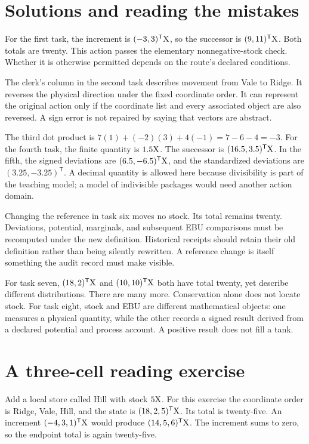\section{Solutions and reading the mistakes}

For the first task, the increment is \((-3,3)^{\mathsf T}\mathrm{X}\), so the successor is \((9,11)^{\mathsf T}\mathrm{X}\). Both totals are twenty. This action passes the elementary nonnegative-stock check. Whether it is otherwise permitted depends on the route's declared conditions.

The clerk's column in the second task describes movement from Vale to Ridge. It reverses the physical direction under the fixed coordinate order. It can represent the original action only if the coordinate list and every associated object are also reversed. A sign error is not repaired by saying that vectors are abstract.

The third dot product is \(7(1)+(-2)(3)+4(-1)=7-6-4=-3\). For the fourth task, the finite quantity is \(1.5\mathrm{X}\). The successor is \((16.5,3.5)^{\mathsf T}\mathrm{X}\). In the fifth, the signed deviations are \((6.5,-6.5)^{\mathsf T}\mathrm{X}\), and the standardized deviations are \((3.25,-3.25)^{\mathsf T}\). A decimal quantity is allowed here because divisibility is part of the teaching model; a model of indivisible packages would need another action domain.

Changing the reference in task six moves no stock. Its total remains twenty. Deviations, potential, marginals, and subsequent EBU comparisons must be recomputed under the new definition. Historical receipts should retain their old definition rather than being silently rewritten. A reference change is itself something the audit record must make visible.

For task seven, \((18,2)^{\mathsf T}\mathrm{X}\) and \((10,10)^{\mathsf T}\mathrm{X}\) both have total twenty, yet describe different distributions. There are many more. Conservation alone does not locate stock. For task eight, stock and EBU are different mathematical objects: one measures a physical quantity, while the other records a signed result derived from a declared potential and process account. A positive result does not fill a tank.

\section{A three-cell reading exercise}

Add a local store called Hill with stock \(5\mathrm{X}\). For this exercise the coordinate order is Ridge, Vale, Hill, and the state is \((18,2,5)^{\mathsf T}\mathrm{X}\). Its total is twenty-five. An increment \((-4,3,1)^{\mathsf T}\mathrm{X}\) would produce \((14,5,6)^{\mathsf T}\mathrm{X}\). The increment sums to zero, so the endpoint total is again twenty-five.

